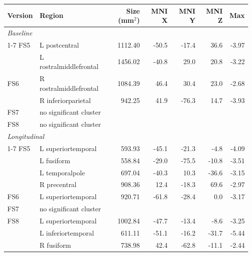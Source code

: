 \begin{tabular}{llrrrrr}
\toprule
Version & Region & Size (mm$^2$) & MNI X & MNI Y & MNI Z & Max \\
\midrule
\multicolumn{7}{l}{\textit{Baseline}} \\
\cmidrule(lr){1-7}
FS5 & L postcentral & 1112.40 & -50.5 & -17.4 & 36.6 & -3.97 \\
 & L rostralmiddlefrontal & 1456.02 & -40.8 & 29.0 & 20.8 & -3.22 \\
\rowcolor{gray!12}FS6 & R rostralmiddlefrontal & 1084.39 & 46.4 & 30.4 & 23.0 & -2.68 \\
\rowcolor{gray!12} & R inferiorparietal & 942.25 & 41.9 & -76.3 & 14.7 & -3.93 \\
FS7 & \multicolumn{6}{l}{no significant cluster} \\
\rowcolor{gray!12}FS8 & \multicolumn{6}{l}{no significant cluster} \\
\multicolumn{7}{l}{\textit{Longitudinal}} \\
\cmidrule(lr){1-7}
FS5 & L superiortemporal & 593.93 & -45.1 & -21.3 & -4.8 & -4.09 \\
 & L fusiform & 558.84 & -29.0 & -75.5 & -10.8 & -3.51 \\
 & L temporalpole & 697.04 & -40.3 & 10.3 & -36.6 & -3.15 \\
 & R precentral & 908.36 & 12.4 & -18.3 & 69.6 & -2.97 \\
\rowcolor{gray!12}FS6 & L superiortemporal & 920.71 & -61.8 & -28.4 & 0.0 & -3.17 \\
FS7 & \multicolumn{6}{l}{no significant cluster} \\
\rowcolor{gray!12}FS8 & L superiortemporal & 1002.84 & -47.7 & -13.4 & -8.6 & -3.25 \\
\rowcolor{gray!12} & L inferiortemporal & 611.11 & -51.1 & -16.2 & -31.7 & -5.44 \\
\rowcolor{gray!12} & R fusiform & 738.98 & 42.4 & -62.8 & -11.1 & -2.44 \\
\bottomrule
\end{tabular}
